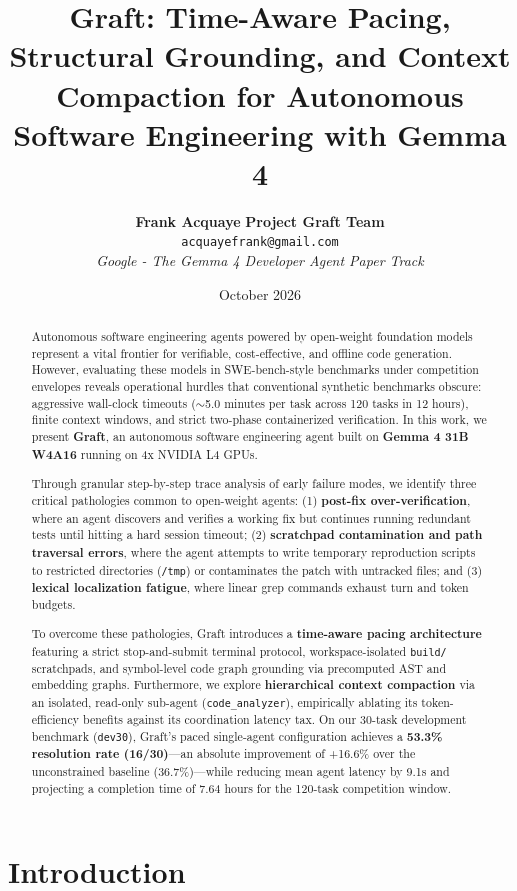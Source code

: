 \documentclass[10pt,twocolumn,letterpaper]{article}
\title{\textbf{\Large Graft: Time-Aware Pacing, Structural Grounding, and Context Compaction for Autonomous Software Engineering with Gemma 4}}
\author{
  \textbf{Frank Acquaye} \qquad \textbf{Project Graft Team} \\
  \texttt{acquayefrank@gmail.com} \\
  \small\textit{Google - The Gemma 4 Developer Agent Paper Track}
}
\date{\small October 2026}
\begin{document}
\maketitle

\begin{abstract}
\noindent Autonomous software engineering agents powered by open-weight foundation models represent a vital frontier for verifiable, cost-effective, and offline code generation. However, evaluating these models in SWE-bench-style benchmarks under competition envelopes reveals operational hurdles that conventional synthetic benchmarks obscure: aggressive wall-clock timeouts ($\sim$5.0 minutes per task across 120 tasks in 12 hours), finite context windows, and strict two-phase containerized verification. In this work, we present \textbf{Graft}, an autonomous software engineering agent built on \textbf{Gemma 4 31B W4A16} running on 4x NVIDIA L4 GPUs.

Through granular step-by-step trace analysis of early failure modes, we identify three critical pathologies common to open-weight agents: (1) \textbf{post-fix over-verification}, where an agent discovers and verifies a working fix but continues running redundant tests until hitting a hard session timeout; (2) \textbf{scratchpad contamination and path traversal errors}, where the agent attempts to write temporary reproduction scripts to restricted directories (\texttt{/tmp}) or contaminates the patch with untracked files; and (3) \textbf{lexical localization fatigue}, where linear grep commands exhaust turn and token budgets.

To overcome these pathologies, Graft introduces a \textbf{time-aware pacing architecture} featuring a strict stop-and-submit terminal protocol, workspace-isolated \texttt{build/} scratchpads, and symbol-level code graph grounding via precomputed AST and embedding graphs. Furthermore, we explore \textbf{hierarchical context compaction} via an isolated, read-only sub-agent (\texttt{code\_analyzer}), empirically ablating its token-efficiency benefits against its coordination latency tax. On our 30-task development benchmark (\texttt{dev30}), Graft's paced single-agent configuration achieves a \textbf{53.3\% resolution rate (16/30)}---an absolute improvement of +16.6\% over the unconstrained baseline (36.7\%)---while reducing mean agent latency by 9.1s and projecting a completion time of 7.64 hours for the 120-task competition window.
\end{abstract}

\section{Introduction}
\end{document}
